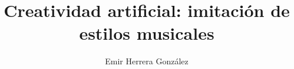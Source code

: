 
\title{Creatividad artificial: imitación de estilos musicales}
\author{Emir Herrera González}

\maketitle
\publicationrights
